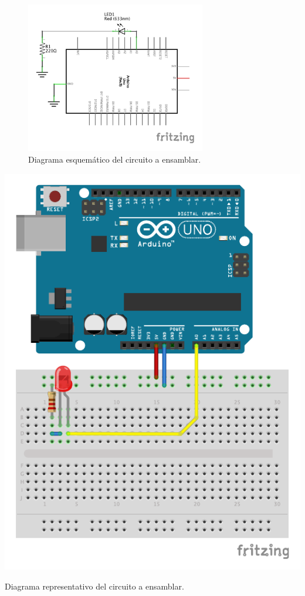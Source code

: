 		\begin{figure}[h]
			\begin{center}
				\includegraphics[width=0.7\textwidth]{images/1-LED-A0_sch.pdf}
				\caption{Diagrama esquemático del circuito a ensamblar.}
				\label{dia:anal-uno-sch}
			\end{center}
		\end{figure}

		\begin{marginfigure}
			\begin{center}
				\includegraphics[width=\textwidth]{images/1-LED-A0_bb.pdf}
				\caption{Diagrama representativo del circuito a ensamblar.}
				\label{dia:anal-uno}
			\end{center}
		\end{marginfigure}

